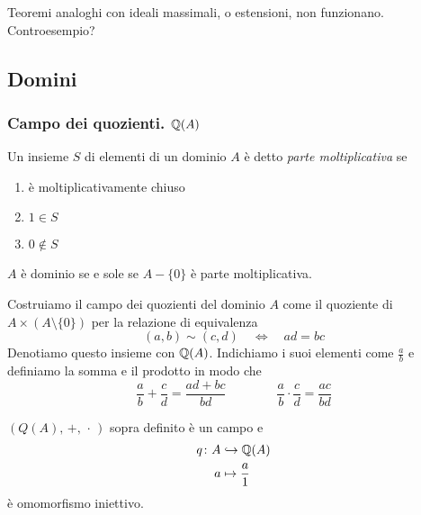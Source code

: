 \begin{multicols}{2}
Teoremi analoghi con ideali massimali, o estensioni, non funzionano. Controesempio?

\end{multicols}

\subsection{Domini}
\begin{multicols}{2}

\subsubsection{Campo dei quozienti. $ \mathbb{Q}(A) $}

\begin{definition}
	Un insieme $ S $ di elementi di un dominio $ A $ è detto \emph{parte moltiplicativa} se
	\begin{enumerate}
		\item è moltiplicativamente chiuso
		\item $ 1 \in S $
		\item $ 0 \notin S $
	\end{enumerate}
\end{definition}

\begin{remark}
	$ A $ è dominio se e sole se $ A - \{0\} $ è parte moltiplicativa.
\end{remark}

Costruiamo il campo dei quozienti del dominio $ A $ come il quoziente di $ A \times (A \setminus \{0\}) $ per la relazione di equivalenza $$  (a, b) \sim (c, d) \quad\Leftrightarrow\quad ad = bc $$
Denotiamo questo insieme con $ \mathbb{Q}(A) $. Indichiamo i suoi elementi come $ \frac{a}{b} $ e definiamo la somma e il prodotto in modo che
\[ \frac{a}{b} + \frac{c}{d} = \frac{ad + bc}{bd} \qquad\qquad \frac{a}{b}\cdot \frac{c}{d} = \frac{ac}{bd} \]

\begin{remark}
	$ (Q(A),\, +,\, \cdot\,) $ sopra definito è un campo e
	\begin{align*}
	q \colon A &\hookrightarrow \mathbb{Q}(A) \\
	a &\mapsto \frac{a}{1}
	\end{align*}
	è omomorfismo iniettivo.
\end{remark}


\end{multicols}
